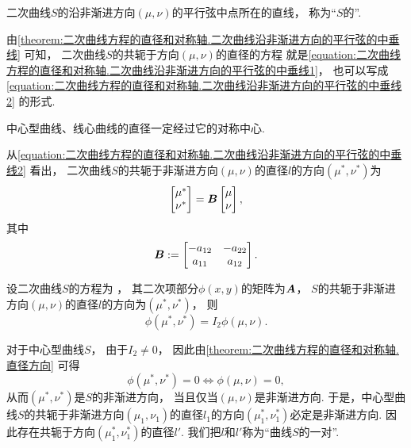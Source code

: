 \begin{definition}
二次曲线\(S\)的沿非渐进方向\((\mu,\nu)\)的平行弦中点所在的直线，
称为“\(S\)的”.
\end{definition}

由\cref{theorem:二次曲线方程的直径和对称轴.二次曲线沿非渐进方向的平行弦的中垂线} 可知，
二次曲线\(S\)的共轭于方向\((\mu,\nu)\)的直径的方程
就是\cref{equation:二次曲线方程的直径和对称轴.二次曲线沿非渐进方向的平行弦的中垂线1}，
也可以写成\cref{equation:二次曲线方程的直径和对称轴.二次曲线沿非渐进方向的平行弦的中垂线2} 的形式.

\begin{corollary}
中心型曲线、线心曲线的直径一定经过它的对称中心.
\end{corollary}

从\cref{equation:二次曲线方程的直径和对称轴.二次曲线沿非渐进方向的平行弦的中垂线2} 看出，
二次曲线\(S\)的共轭于非渐进方向\((\mu,\nu)\)的直径\(l\)的方向\((\mu^*,\nu^*)\)为\begin{equation*}
	\begin{bmatrix}
		\mu^* \\ \nu^*
	\end{bmatrix}
	= \boldsymbol{B}
	\begin{bmatrix}
		\mu \\ \nu
	\end{bmatrix},
\end{equation*}
其中\begin{equation*}
	\boldsymbol{B} := \begin{bmatrix}
		-a_{12} & -a_{22} \\
		a_{11} & a_{12}
	\end{bmatrix}.
\end{equation*}

\begin{proposition}\label{theorem:二次曲线方程的直径和对称轴.直径方向}
设二次曲线\(S\)的方程为 ，
其二次项部分\(\phi(x,y)\)的矩阵为\(\boldsymbol{A}\)，
\(S\)的共轭于非渐进方向\((\mu,\nu)\)的直径\(l\)的方向为\((\mu^*,\nu^*)\)，
则\begin{equation*}
	\phi(\mu^*,\nu^*) = I_2 \phi(\mu,\nu).
\end{equation*}
\end{proposition}

对于中心型曲线\(S\)，
由于\(I_2 \neq 0\)，
因此由\cref{theorem:二次曲线方程的直径和对称轴.直径方向} 可得\begin{equation*}
	\phi(\mu^*,\nu^*) = 0
	\iff
	\phi(\mu,\nu) = 0,
\end{equation*}
从而\((\mu^*,\nu^*)\)是\(S\)的非渐进方向，
当且仅当\((\mu,\nu)\)是非渐进方向.
于是，中心型曲线\(S\)的共轭于非渐进方向\((\mu_1,\nu_1)\)的直径\(l_1\)的方向\((\mu^*_1,\nu^*_1)\)必定是非渐进方向.
因此存在共轭于方向\((\mu^*_1,\nu^*_1)\)的直径\(l'\).
我们把\(l\)和\(l'\)称为“曲线\(S\)的一对”.

